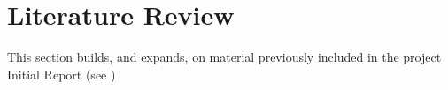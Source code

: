 \section{Literature Review}
This section builds, and expands, on material previously included in the project Initial Report (see )




